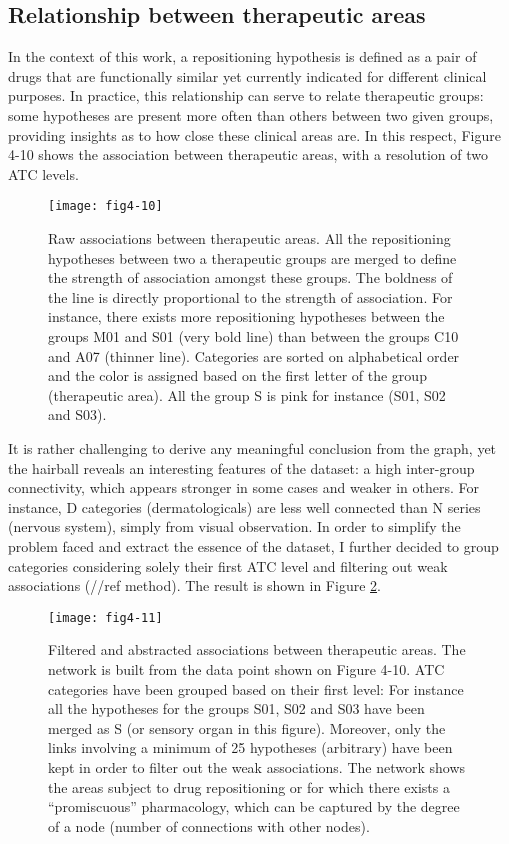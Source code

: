 \subsection{Relationship between therapeutic areas}
In the context of this work, a repositioning hypothesis is defined as a pair of drugs that are functionally similar yet currently indicated for different clinical purposes. In practice, this relationship can serve to relate therapeutic groups: some hypotheses are present more often than others between two given groups, providing insights as to how close these clinical areas are. In this respect, Figure 4-10 shows the association between therapeutic areas, with a resolution of two ATC levels.

\begin{figure}[H]
    \centering
    \texttt{[image: fig4-10]}
    \caption{Raw associations between therapeutic areas. All the repositioning hypotheses between two a therapeutic groups are merged to define the strength of association amongst these groups. The boldness of the line is directly proportional to the strength of association. For instance, there exists more repositioning hypotheses between the groups M01 and S01 (very bold line) than between the groups C10 and A07 (thinner line). Categories are sorted on alphabetical order and the color is assigned based on the first letter of the group (therapeutic area). All the group S is pink for instance (S01, S02 and S03).}
    \label{fig4-10}
\end{figure}

It is rather challenging to derive any meaningful conclusion from the graph, yet the hairball reveals an interesting features of the dataset: a high inter-group connectivity, which appears stronger in some cases and weaker in others. For instance, D categories (dermatologicals) are less well connected than N series (nervous system), simply from visual observation. In order to simplify the problem faced and extract the essence of the dataset, I further decided to group categories considering solely their first ATC level and filtering out weak associations (//ref method). The result is shown in Figure \ref{fig4-11}.

\begin{figure}[H]
    \centering
    \texttt{[image: fig4-11]}
    \caption{Filtered and abstracted associations between therapeutic areas. The network is built from the data point shown on Figure 4-10. ATC categories have been grouped based on their first level: For instance all the hypotheses for the groups S01, S02 and S03 have been merged as S (or sensory organ in this figure). Moreover, only the links involving a minimum of 25 hypotheses (arbitrary) have been kept in order to filter out the weak associations. The network shows the areas subject to drug repositioning or for which there exists a “promiscuous” pharmacology, which can be captured by the degree of a node (number of connections with other nodes).}
    \label{fig4-11}
\end{figure}

